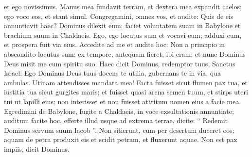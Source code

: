 \begin{biblechapter}
\begin{biblechapter}
\begin{biblechapter}
\begin{biblechapter}
\begin{biblechapter}
\begin{biblechapter}
\begin{biblechapter}
\begin{biblechapter}
\begin{biblechapter}
\begin{biblechapter}
\begin{biblechapter}
\begin{biblechapter}
\begin{biblechapter}
\begin{biblechapter}
\begin{biblechapter}
\begin{biblechapter}
\begin{biblechapter}
\begin{biblechapter}
\begin{biblechapter}
\begin{biblechapter}
\begin{biblechapter}
\begin{biblechapter}
\begin{biblechapter}
\begin{biblechapter}
\begin{biblechapter}
\begin{biblechapter}
\begin{biblechapter}
\begin{biblechapter}
\begin{biblechapter}
\begin{biblechapter}
\begin{biblechapter}
\begin{biblechapter}
\begin{biblechapter}
\begin{biblechapter}
\begin{biblechapter}
\begin{biblechapter}
\begin{biblechapter}
\begin{biblechapter}
\begin{biblechapter}
\begin{biblechapter}
\begin{biblechapter}
\begin{biblechapter}
\begin{biblechapter}
\begin{biblechapter}
\begin{biblechapter}
\begin{biblechapter}
\begin{biblechapter}
\begin{biblechapter}
 et ego novissimus.
 \verse Manus mea fundavit terram,
 et dextera mea expandit caelos;
 ego voco eos, et stant simul.
 \verse Congregamini, omnes vos, et audite:
 Quis de eis annuntiavit haec?
 Dominus dilexit eum;
 faciet voluntatem suam in Babylone
 et brachium suum in Chaldaeis.
 \verse Ego, ego locutus sum et vocavi eum;
 adduxi eum, et prospera fuit via eius.
 \verse Accedite ad me et audite hoc:
 Non a principio in abscondito locutus sum;
 ex tempore, antequam fieret, ibi eram;
 et nunc Dominus Deus misit me cum spiritu suo.
 \verse Haec dicit Dominus,
 redemptor tuus, Sanctus Israel:
 Ego Dominus Deus tuus docens te utilia,
 gubernans te in via, qua ambulas.
 \verse Utinam attendisses mandata mea!
 Facta fuisset sicut flumen pax tua,
 et iustitia tua sicut gurgites maris;
 \verse et fuisset quasi arena semen tuum,
 et stirps uteri tui ut lapilli eius;
 non interisset et non fuisset attritum
 nomen eius a facie mea.
 \verse Egredimini de Babylone, fugite a Chaldaeis,
 in voce exsultationis annuntiate;
 auditum facite hoc, efferte illud usque ad extrema terrae,
 dicite: “ Redemit Dominus servum suum Iacob ”.
 \verse Non sitierunt, cum per desertum duceret eos;
 aquam de petra produxit eis
 et scidit petram, et fluxerunt aquae.
 \verse Non est pax impiis, dicit Dominus.
 

\end{biblechapter}
\end{biblechapter}
\end{biblechapter}
\end{biblechapter}
\end{biblechapter}
\end{biblechapter}
\end{biblechapter}
\end{biblechapter}
\end{biblechapter}
\end{biblechapter}
\end{biblechapter}
\end{biblechapter}
\end{biblechapter}
\end{biblechapter}
\end{biblechapter}
\end{biblechapter}
\end{biblechapter}
\end{biblechapter}
\end{biblechapter}
\end{biblechapter}
\end{biblechapter}
\end{biblechapter}
\end{biblechapter}
\end{biblechapter}
\end{biblechapter}
\end{biblechapter}
\end{biblechapter}
\end{biblechapter}
\end{biblechapter}
\end{biblechapter}
\end{biblechapter}
\end{biblechapter}
\end{biblechapter}
\end{biblechapter}
\end{biblechapter}
\end{biblechapter}
\end{biblechapter}
\end{biblechapter}
\end{biblechapter}
\end{biblechapter}
\end{biblechapter}
\end{biblechapter}
\end{biblechapter}
\end{biblechapter}
\end{biblechapter}
\end{biblechapter}
\end{biblechapter}
\end{biblechapter}
